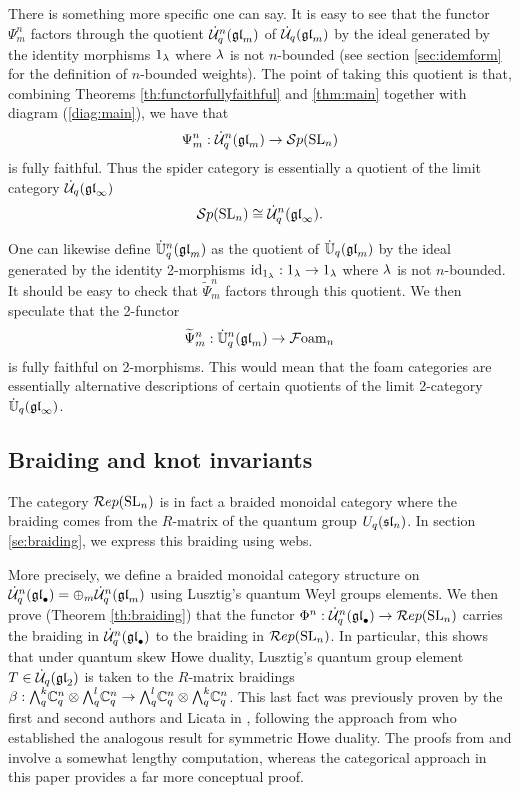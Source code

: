 \documentclass[11pt]{amsart}
\begin{document}
There is something more specific one can say. It is easy to see that the functor $\Psi_m^n$ factors through the quotient $\dU^n(\gl_m)$ of $\dU(\gl_m)$ by the ideal generated by the identity morphisms $1_\l$ where $\l$ is not $n$-bounded (see section \ref{sec:idemform} for the definition of $n$-bounded weights). The point of taking this quotient is that, combining Theorems \ref{th:functorfullyfaithful} and \ref{thm:main} together with diagram (\ref{diag:main}), we have that 
$$\Psi_m^n: \dU^n(\gl_m) \rightarrow \Sp(\SL_n)$$
is fully faithful. Thus the spider category is essentially a quotient of the limit category $\dU(\gl_\infty)$
$$\Sp(\SL_n) \iso \dU^n(\gl_\infty).$$

One can likewise define $\dot{\mathbb{U}}_q^n(\gl_m)$ as the quotient of $\dot{\mathbb{U}}_q(\gl_m)$ by the ideal generated by the identity 2-morphisms ${\rm id}_{1_\l}: 1_\l \rightarrow 1_\l$ where $\l$ is not $n$-bounded. It should be easy to check that $\widetilde{\Psi}_m^n$ factors through this quotient. We then speculate that the 2-functor
$$\widetilde{\Psi}_m^n: \dot{\mathbb{U}}_q^n(\gl_m) \rightarrow \Foam_n$$
is fully faithful on 2-morphisms. This would mean that the foam categories are essentially alternative descriptions of certain quotients of the limit 2-category $\dot{\mathbb{U}}_q(\gl_\infty)$.

\subsection{Braiding and knot invariants}
The category $\Rep(\SL_n)$ is in fact a braided monoidal category where the braiding comes from the $R$-matrix of the quantum group $ U_q(\sl_n)$.  In section \ref{se:braiding}, we express this braiding using webs.

More precisely, we define a braided monoidal category structure on $ \dU^n(\gl_\bullet) = \oplus_m \dU^n(\gl_m) $ using Lusztig's quantum Weyl groups elements.  We then prove (Theorem \ref{th:braiding}) that the functor $ \Phi^n : \dU^n(\gl_\bullet) \rightarrow \Rep(\SL_n) $ carries the braiding in $ \dU^n(\gl_\bullet) $ to the braiding in $ \Rep(\SL_n) $.  In particular, this shows that under quantum skew Howe duality, Lusztig's quantum group element $ T \in \dU(\gl_2) $ is taken to the $R$-matrix braidings $ \beta : \Alt{k}{q} \bC^n_q \otimes \Alt{l}{q} \bC^n_q \rightarrow \Alt{l}{q} \bC^n_q \otimes \Alt{k}{q} \bC^n_q$.  This last fact was previously proven by the first and second authors and Licata in \cite{MR2593278}, following the approach from \cite{MR1896470} who established the analogous result for symmetric Howe duality.  The proofs from \cite{MR1896470} and \cite{MR2593278} involve a somewhat lengthy computation, whereas the categorical approach in this paper provides a far more conceptual proof.
\end{document}
